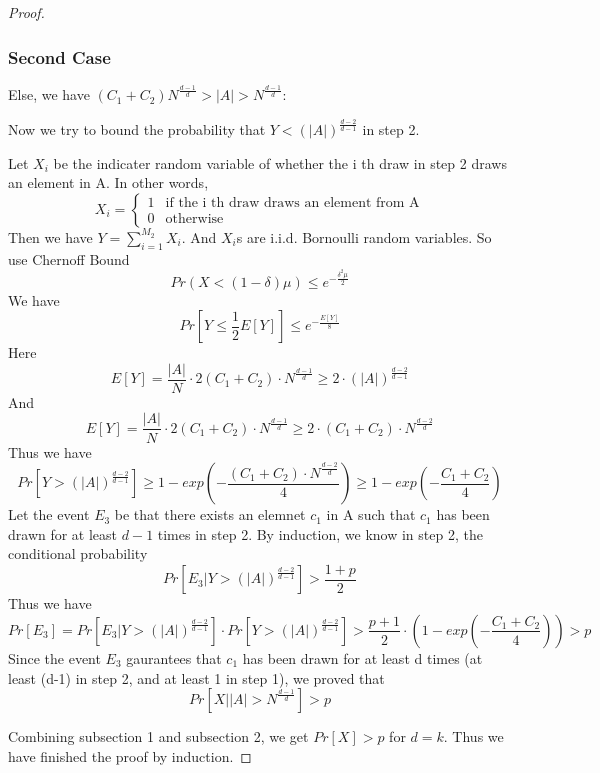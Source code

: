 \documentclass{article}
\begin{document}
\begin{spacing}{1.1}
\begin{proof}
    \subsubsection{Second Case}
    Else, we have $(C_1 + C_2)N^{\frac{d-1}{d}} > |A| > N^{\frac{d-1}{d}}$:

    Now we try to bound the probability that $Y < (|A|)^{\frac{d-2}{d-1}}$ in step 2.

    Let $X_i$ be the indicater random variable of whether the i th draw in step 2 draws an element in A. In other words,
    \begin{equation}
        X_i = \begin{cases}
            1 & \text{if the i th draw draws an element from A} \\
            0 & \text{otherwise}
        \end{cases}
    \end{equation}
    Then we have $Y = \sum_{i=1}^{M_2}X_i$. And $X_i$s are i.i.d. Bornoulli random variables. So use Chernoff Bound
    $$ Pr(X < (1 - \delta)\mu) \leq e^{-\frac{\delta^2 \mu}{2}}$$
    We have
    \begin{equation}
        Pr[Y \leq \frac{1}{2}E[Y]] \leq e^{-\frac{E[Y]}{8}}
    \end{equation}
    Here 
    $$E[Y] = \frac{|A|}{N} \cdot 2(C_1 + C_2)\cdot N^{\frac{d-1}{d}} \geq 2\cdot (|A|)^{\frac{d-2}{d-1}}$$
    And
    $$E[Y] = \frac{|A|}{N} \cdot 2(C_1 + C_2)\cdot N^{\frac{d-1}{d}} \geq 2\cdot (C_1 + C_2)\cdot N^{\frac{d-2}{d}}$$
    Thus we have
    $$Pr[Y > (|A|)^{\frac{d-2}{d-1}}] \geq 1 - exp(-\frac{(C_1 + C_2)\cdot N^{\frac{d-2}{d}}}{4}) \geq 1 - exp(-\frac{C_1 + C_2}{4})$$
    Let the event $E_3$ be that there exists an elemnet $c_1$ in A such that $c_1$ has been drawn for at least $d-1$ times in step 2. By induction, we know in step 2, the conditional probability
    $$Pr[E_3 | Y > (|A|)^{\frac{d-2}{d-1}}] > \frac{1+p}{2}$$
    Thus we have
    \begin{equation}
        Pr[E_3] = Pr[E_3 | Y > (|A|)^{\frac{d-2}{d-1}}]\cdot Pr[Y > (|A|)^{\frac{d-2}{d-1}}] > \frac{p+1}{2}\cdot (1 - exp(-\frac{C_1 + C_2}{4})) > p
    \end{equation}
    Since the event $E_3$ gaurantees that $c_1$ has been drawn for at least d times (at least (d-1) in step 2, and at least 1 in step 1), we proved that
    $$Pr[X | |A| > N^{\frac{d-1}{d}}] > p$$

    Combining subsection 1 and subsection 2, we get $Pr[X] > p$ for $d = k$. Thus we have finished the proof by induction.
    \end{proof}



\end{spacing}
\end{document}
